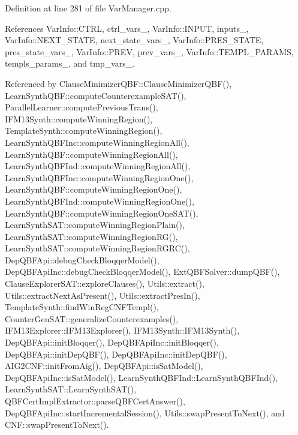 Definition at line 281 of file Var\-Manager.\-cpp.



References Var\-Info\-::\-C\-T\-R\-L, ctrl\-\_\-vars\-\_\-, Var\-Info\-::\-I\-N\-P\-U\-T, inputs\-\_\-, Var\-Info\-::\-N\-E\-X\-T\-\_\-\-S\-T\-A\-T\-E, next\-\_\-state\-\_\-vars\-\_\-, Var\-Info\-::\-P\-R\-E\-S\-\_\-\-S\-T\-A\-T\-E, pres\-\_\-state\-\_\-vars\-\_\-, Var\-Info\-::\-P\-R\-E\-V, prev\-\_\-vars\-\_\-, Var\-Info\-::\-T\-E\-M\-P\-L\-\_\-\-P\-A\-R\-A\-M\-S, templs\-\_\-params\-\_\-, and tmp\-\_\-vars\-\_\-.



Referenced by Clause\-Minimizer\-Q\-B\-F\-::\-Clause\-Minimizer\-Q\-B\-F(), Learn\-Synth\-Q\-B\-F\-::compute\-Counterexample\-S\-A\-T(), Parallel\-Learner\-::compute\-Previous\-Trans(), I\-F\-M13\-Synth\-::compute\-Winning\-Region(), Template\-Synth\-::compute\-Winning\-Region(), Learn\-Synth\-Q\-B\-F\-Inc\-::compute\-Winning\-Region\-All(), Learn\-Synth\-Q\-B\-F\-::compute\-Winning\-Region\-All(), Learn\-Synth\-Q\-B\-F\-Ind\-::compute\-Winning\-Region\-All(), Learn\-Synth\-Q\-B\-F\-Inc\-::compute\-Winning\-Region\-One(), Learn\-Synth\-Q\-B\-F\-::compute\-Winning\-Region\-One(), Learn\-Synth\-Q\-B\-F\-Ind\-::compute\-Winning\-Region\-One(), Learn\-Synth\-Q\-B\-F\-::compute\-Winning\-Region\-One\-S\-A\-T(), Learn\-Synth\-S\-A\-T\-::compute\-Winning\-Region\-Plain(), Learn\-Synth\-S\-A\-T\-::compute\-Winning\-Region\-R\-G(), Learn\-Synth\-S\-A\-T\-::compute\-Winning\-Region\-R\-G\-R\-C(), Dep\-Q\-B\-F\-Api\-::debug\-Check\-Bloqqer\-Model(), Dep\-Q\-B\-F\-Api\-Inc\-::debug\-Check\-Bloqqer\-Model(), Ext\-Q\-B\-F\-Solver\-::dump\-Q\-B\-F(), Clause\-Explorer\-S\-A\-T\-::explore\-Clauses(), Utils\-::extract(), Utils\-::extract\-Next\-As\-Present(), Utils\-::extract\-Pres\-In(), Template\-Synth\-::find\-Win\-Reg\-C\-N\-F\-Templ(), Counter\-Gen\-S\-A\-T\-::generalize\-Counterexamples(), I\-F\-M13\-Explorer\-::\-I\-F\-M13\-Explorer(), I\-F\-M13\-Synth\-::\-I\-F\-M13\-Synth(), Dep\-Q\-B\-F\-Api\-::init\-Bloqqer(), Dep\-Q\-B\-F\-Api\-Inc\-::init\-Bloqqer(), Dep\-Q\-B\-F\-Api\-::init\-Dep\-Q\-B\-F(), Dep\-Q\-B\-F\-Api\-Inc\-::init\-Dep\-Q\-B\-F(), A\-I\-G2\-C\-N\-F\-::init\-From\-Aig(), Dep\-Q\-B\-F\-Api\-::is\-Sat\-Model(), Dep\-Q\-B\-F\-Api\-Inc\-::is\-Sat\-Model(), Learn\-Synth\-Q\-B\-F\-Ind\-::\-Learn\-Synth\-Q\-B\-F\-Ind(), Learn\-Synth\-S\-A\-T\-::\-Learn\-Synth\-S\-A\-T(), Q\-B\-F\-Cert\-Impl\-Extractor\-::parse\-Q\-B\-F\-Cert\-Answer(), Dep\-Q\-B\-F\-Api\-Inc\-::start\-Incremental\-Session(), Utils\-::swap\-Present\-To\-Next(), and C\-N\-F\-::swap\-Present\-To\-Next().

